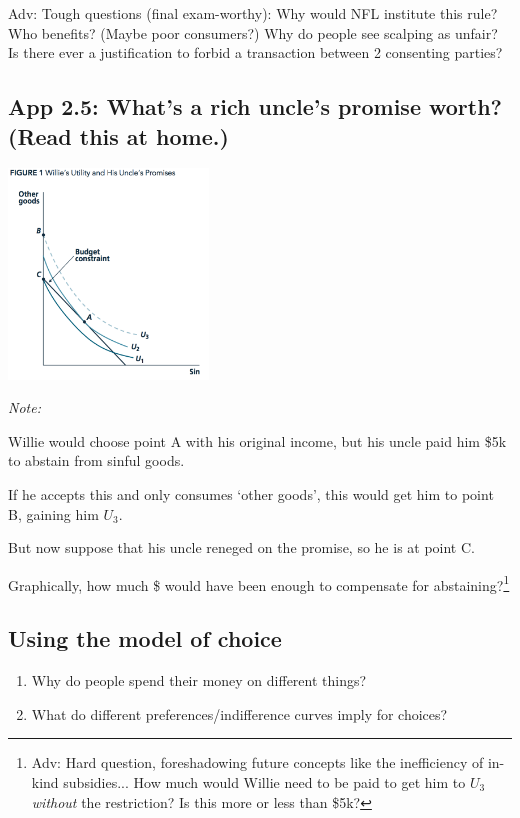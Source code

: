 \documentclass[]{article}
\providecommand{\tightlist}{%
  \setlength{\itemsep}{0pt}\setlength{\parskip}{0pt}}
\begin{document}
\textcolor{RawSienna}{Adv: Tough questions (final exam-worthy):} Why
would NFL institute this rule? Who benefits? (Maybe poor consumers?) Why
do people see scalping as unfair? Is there ever a justification to
forbid a transaction between 2 consenting parties?

\hypertarget{app-2.5-whats-a-rich-uncles-promise-worth-read-this-at-home.}{%
\subsection{App 2.5: What's a rich uncle's promise worth? (Read this at
home.)}\label{app-2.5-whats-a-rich-uncles-promise-worth-read-this-at-home.}}

\includegraphics[height=2.2in]{picsfigs/williesuncle.png}

\emph{Note:}

Willie would choose point A with his original income, but his uncle paid
him \$5k to abstain from sinful goods.

If he accepts this and only consumes `other goods', this would get him
to point B, gaining him \(U_3\).

But now suppose that his uncle reneged on the promise, so he is at point
C.

Graphically, how much \$ would have been enough to compensate for
abstaining?\footnote{\textcolor{RawSienna}{Adv: Hard question, foreshadowing future concepts like the inefficiency of in-kind subsidies... How much would Willie need to be paid to get him to $U_3$ \emph{without} the restriction?  Is this more or less than \$5k?}}

\hypertarget{using-the-model-of-choice}{%
\subsection{Using the model of choice}\label{using-the-model-of-choice}}

\begin{enumerate}
\def\labelenumi{\arabic{enumi}.}
\tightlist
\item
  Why do people spend their money on different things?
\item
  What do different preferences/indifference curves imply for choices?
\end{enumerate}
\end{document}
